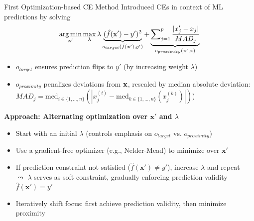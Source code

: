 \documentclass[10pt,compress,t,notes=noshow, xcolor=table]{beamer}
\begin{document}
\begin{frame}{First Optimization-based CE Method }
Introduced CEs in context of ML predictions by solving
		$$
			\mathop{\mathrm{arg\,min}}_{\mathbf{x}'} \max_{\lambda} \lambda \underbrace{(\hat{f}(\mathbf{x}') - y')^2}_{o_{target}(\hat{f}(\mathbf{x}'), y')} + \underbrace{\sum\nolimits_{j = 1}^p \frac{|x'_j - x_j|}{MAD_j}}_{o_{proximity}(\mathbf{x}', \mathbf{x})}
		$$
\begin{itemize}
\item $o_{target}$ ensures prediction flips to $y'$ (by increasing weight $\lambda$)
\item $o_{proximity}$ penalizes deviations from $\mathbf{x}$, rescaled by median absolute deviation: $MAD_j = \text{med}_{i \in \{1, \dots, n\}} ( | x^{(i)}_j - \text{med}_{k\in \{1, \dots, n\}} (x^{(k)}_j) | )$)
\end{itemize}

\lz
\pause

\textbf{Approach: Alternating optimization over \(\mathbf{x}'\) and \(\lambda\)}

\begin{itemize}
  \item Start with an initial \(\lambda\) (controls emphasis on $o_{target}$ vs. $o_{proximity}$)
  \item Use a gradient-free optimizer (e.g., Nelder-Mead) to minimize over \(\mathbf{x}'\)
  \item If prediction constraint not satisfied (\(\hat{f}(\mathbf{x}') \ne y'\)), increase \(\lambda\) and repeat
  \\
  $\leadsto$ \(\lambda\) serves as soft constraint, gradually enforcing prediction validity \(\hat{f}(\mathbf{x}') = y'\)
  \item Iteratively shift focus: first achieve prediction validity, then minimize proximity%
\end{itemize}


	

\end{frame}
\end{document}
